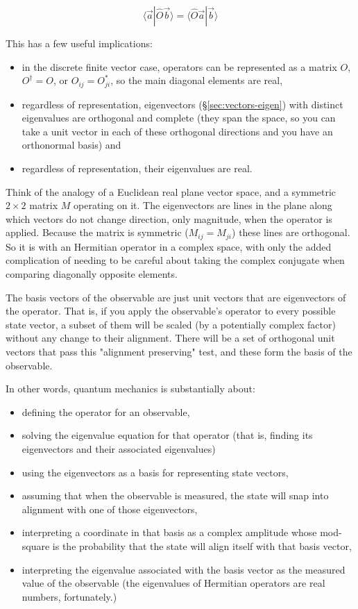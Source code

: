 $$\langle \vec{a}|\hat{O} \vec{b} \rangle = \langle \hat{O} \vec{a}| \vec{b} \rangle$$

This has a few useful implications:

\begin{itemize}
  \item in the discrete finite vector case, operators can be represented as a matrix $O$, $O^{\dagger} = O$, or $O_{ij} = O_{ji}^*$, so the main diagonal elements are real,
  \item regardless of representation, eigenvectors (§\ref{sec:vectors-eigen}) with distinct eigenvalues are orthogonal and complete (they span the space, so you can take a unit vector in each of these orthogonal directions and you have an orthonormal basis) and
  \item regardless of representation, their eigenvalues are real.
\end{itemize}

Think of the analogy of a Euclidean real plane vector space, and a symmetric $2 \times 2$ matrix $M$ operating on it. The eigenvectors are lines in the plane along which vectors do not change direction, only magnitude, when the operator is applied. Because the matrix is symmetric ($M_{ij} = M_{ji}$) these lines are orthogonal. So it is with an Hermitian operator in a complex space, with only the added complication of needing to be careful about taking the complex conjugate when comparing diagonally opposite elements.

The basis vectors of the observable are just unit vectors that are eigenvectors of the operator. That is, if you apply the observable's operator to every possible state vector, a subset of them will be scaled (by a potentially complex factor) without any change to their alignment. There will be a set of orthogonal unit vectors that pass this "alignment preserving" test, and these form the basis of the observable.

In other words, quantum mechanics is substantially about:

\begin{itemize}
  \item defining the operator for an observable,
  \item solving the eigenvalue equation for that operator (that is, finding its eigenvectors and their associated eigenvalues)
  \item using the eigenvectors as a basis for representing state vectors,
  \item assuming that when the observable is measured, the state will snap into alignment with one of those eigenvectors,
  \item interpreting a coordinate in that basis as a complex amplitude whose mod-square is the probability that the state will align itself with that basis vector,
  \item interpreting the eigenvalue associated with the basis vector as the measured value of the observable (the eigenvalues of Hermitian operators are real numbers, fortunately.)
\end{itemize}

